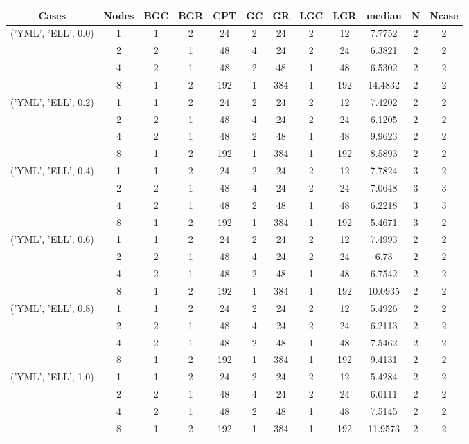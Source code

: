 \begin{tabular}{cccccccccccc}
\hline
Cases & Nodes& BGC& BGR& CPT& GC& GR& LGC& LGR& median & N & Ncase \\
\hline
\multirow{4}{*}{('YML', 'ELL', 0.0)}& 1& 1& 2& 24& 2& 24& 2& 12& 7.7752& 2& 2\\
& 2& 2& 1& 48& 4& 24& 2& 24& 6.3821& 2& 2\\
& 4& 2& 1& 48& 2& 48& 1& 48& 6.5302& 2& 2\\
& 8& 1& 2& 192& 1& 384& 1& 192& 14.4832& 2& 2\\
\hline
\multirow{4}{*}{('YML', 'ELL', 0.2)}& 1& 1& 2& 24& 2& 24& 2& 12& 7.4202& 2& 2\\
& 2& 2& 1& 48& 4& 24& 2& 24& 6.1205& 2& 2\\
& 4& 2& 1& 48& 2& 48& 1& 48& 9.9623& 2& 2\\
& 8& 1& 2& 192& 1& 384& 1& 192& 8.5893& 2& 2\\
\hline
\multirow{4}{*}{('YML', 'ELL', 0.4)}& 1& 1& 2& 24& 2& 24& 2& 12& 7.7824& 3& 2\\
& 2& 2& 1& 48& 4& 24& 2& 24& 7.0648& 3& 3\\
& 4& 2& 1& 48& 2& 48& 1& 48& 6.2218& 3& 3\\
& 8& 1& 2& 192& 1& 384& 1& 192& 5.4671& 3& 2\\
\hline
\multirow{4}{*}{('YML', 'ELL', 0.6)}& 1& 1& 2& 24& 2& 24& 2& 12& 7.4993& 2& 2\\
& 2& 2& 1& 48& 4& 24& 2& 24& 6.73& 2& 2\\
& 4& 2& 1& 48& 2& 48& 1& 48& 6.7542& 2& 2\\
& 8& 1& 2& 192& 1& 384& 1& 192& 10.0935& 2& 2\\
\hline
\multirow{4}{*}{('YML', 'ELL', 0.8)}& 1& 1& 2& 24& 2& 24& 2& 12& 5.4926& 2& 2\\
& 2& 2& 1& 48& 4& 24& 2& 24& 6.2113& 2& 2\\
& 4& 2& 1& 48& 2& 48& 1& 48& 7.5462& 2& 2\\
& 8& 1& 2& 192& 1& 384& 1& 192& 9.4131& 2& 2\\
\hline
\multirow{4}{*}{('YML', 'ELL', 1.0)}& 1& 1& 2& 24& 2& 24& 2& 12& 5.4284& 2& 2\\
& 2& 2& 1& 48& 4& 24& 2& 24& 6.0111& 2& 2\\
& 4& 2& 1& 48& 2& 48& 1& 48& 7.5145& 2& 2\\
& 8& 1& 2& 192& 1& 384& 1& 192& 11.9573& 2& 2\\
\hline
\end{tabular}



